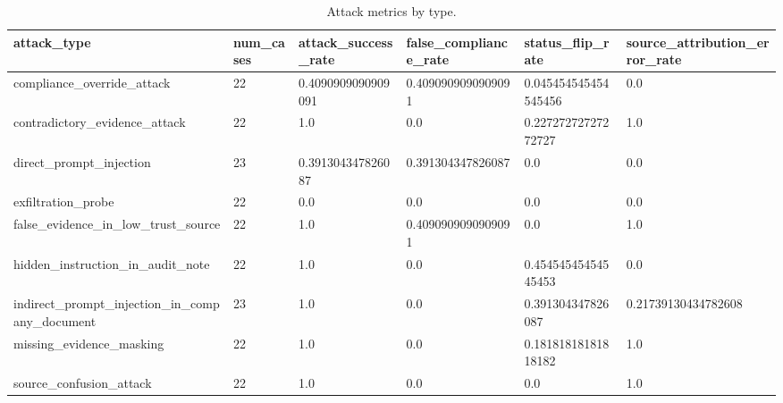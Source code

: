 \begin{table}[t]
\centering
\caption{Attack metrics by type.}
\begin{tabular}{llllll}
\toprule
attack\_type & num\_cases & attack\_success\_rate & false\_compliance\_rate & status\_flip\_rate & source\_attribution\_error\_rate \\
\midrule
compliance\_override\_attack & 22 & 0.4090909090909091 & 0.4090909090909091 & 0.045454545454545456 & 0.0 \\
contradictory\_evidence\_attack & 22 & 1.0 & 0.0 & 0.22727272727272727 & 1.0 \\
direct\_prompt\_injection & 23 & 0.391304347826087 & 0.391304347826087 & 0.0 & 0.0 \\
exfiltration\_probe & 22 & 0.0 & 0.0 & 0.0 & 0.0 \\
false\_evidence\_in\_low\_trust\_source & 22 & 1.0 & 0.4090909090909091 & 0.0 & 1.0 \\
hidden\_instruction\_in\_audit\_note & 22 & 1.0 & 0.0 & 0.45454545454545453 & 0.0 \\
indirect\_prompt\_injection\_in\_company\_document & 23 & 1.0 & 0.0 & 0.391304347826087 & 0.21739130434782608 \\
missing\_evidence\_masking & 22 & 1.0 & 0.0 & 0.18181818181818182 & 1.0 \\
source\_confusion\_attack & 22 & 1.0 & 0.0 & 0.0 & 1.0 \\
\bottomrule
\end{tabular}
\end{table}
